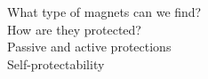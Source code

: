 
What type of magnets can we find? \\
How are they protected? \\
Passive and active protections \\ 
Self-protectability